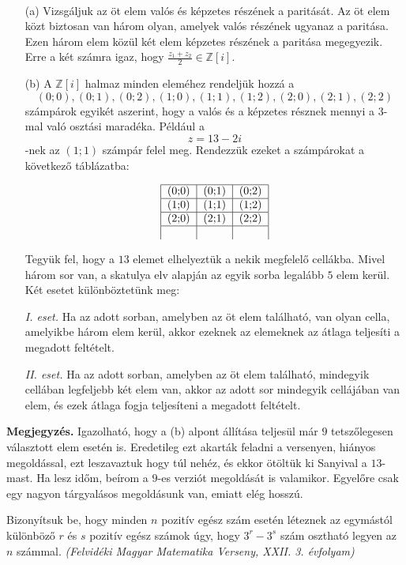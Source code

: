 \begin{solution}
	~
	\begin{enumerate}
		\item[(a)] Vizsgáljuk az öt elem valós és képzetes részének a paritását. Az
		öt elem közt biztosan van három olyan, amelyek valós részének ugyanaz
		a paritása. Ezen három elem közül két elem képzetes részének a paritása
		megegyezik. Erre a két számra igaz, hogy $\frac{z_{1}+z_{2}}{2}\in\mathbb{Z}[i]$.
		\item[(b)] A $\mathbb{Z}[i]$ halmaz minden eleméhez rendeljük hozzá a 
		\[
		(0;0),(0;1),(0;2),(1;0),(1;1),(1;2),(2;0),(2;1),(2;2)
		\]
		számpárok egyikét aszerint, hogy a valós és a képzetes résznek mennyi
		a 3-mal való osztási maradéka. Például a 
		\[
		z=13-2i
		\]
		-nek az $(1;1)$ számpár felel meg. Rendezzük ezeket a számpárokat
		a következő táblázatba:
		
		\[
		\begin{tabular}{|c|c|c|}
			\hline  (0;0)  &  (0;1)  &  (0;2)\\
			\hline  (1;0)  &  (1;1)  &  (1;2)\\
			\hline  (2;0)  &  (2;1)  &  (2;2)\\
			\hline   &   &  
		\end{tabular}
		\]
		
		Tegyük fel, hogy a $13$ elemet elhelyeztük a nekik megfelelő cellákba.
		Mivel három sor van, a skatulya elv alapján az egyik sorba legalább
		$5$ elem kerül. Két esetet különböztetünk meg:
		
		\emph{I. eset.} Ha az adott sorban, amelyben az öt elem található,
		van olyan cella, amelyikbe három elem kerül, akkor ezeknek az elemeknek
		az átlaga teljesíti a megadott feltételt.
		
		\emph{II. eset.} Ha az adott sorban, amelyben az öt elem található,
		mindegyik cellában legfeljebb két elem van, akkor az adott sor mindegyik
		cellájában van elem, és ezek átlaga fogja teljesíteni a megadott feltételt. 
		
	\end{enumerate}
	\textbf{Megjegyzés.} Igazolható, hogy a (b) alpont állítása teljesül
	már $9$ tetszőlegesen választott elem esetén is. Eredetileg ezt akarták
	feladni a versenyen, hiányos megoldással, ezt leszavaztuk hogy túl
	nehéz, és ekkor ötöltük ki Sanyival a $13$-mast. Ha lesz időm, beírom
	a $9$-es verziót megoldását is valamikor. Egyelőre csak egy nagyon
	tárgyalásos megoldásunk van, emiatt elég hosszú. 
\end{solution}
\begin{extraproblem}
	Bizonyítsuk be, hogy minden $n$ pozitív egész szám esetén léteznek
	az egymástól különböző $r$ és $s$ pozitív egész számok úgy, hogy
	$3^{r}-3^{s}$ szám osztható legyen az $n$ számmal. \emph{(Felvidéki
		Magyar Matematika Verseny, XXII. 3. évfolyam) }
\end{extraproblem}

